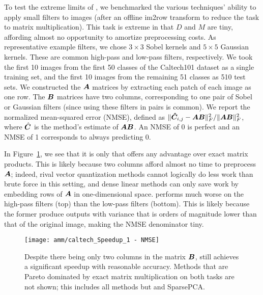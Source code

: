 To test the extreme limits of \ours, we benchmarked the various techniques' ability to apply small filters to images (after an offline im2row transform to reduce the task to matrix multiplication). This task is extreme in that $D$ and $M$ are tiny, affording almost no opportunity to amortize preprocessing costs. As representative example filters, we chose $3 \times 3$ Sobel kernels and $5 \times 5$ Gaussian kernels. These are common high-pass and low-pass filters, respectively. We took the first 10 images from the first 50 classes of the Caltech101 dataset \cite{caltech} as a single training set, and the first 10 images from the remaining 51 classes as 510 test sets. We constructed the $\bm{A}$ matrices by extracting each patch of each image as one row. The $\bm{B}$ matrices have two columns, corresponding to one pair of Sobel or Gaussian filters (since using these filters in pairs is common). %
We report the normalized mean-squared error (NMSE), defined as $\lVert\bm{\hat{C}}_{i,j} - \bm{A}\bm{B}\rVert^2_F / \lVert\bm{A}\bm{B}\rVert^2_F$, where $\hat{\bm{C}}$ is the method's estimate of $\bm{A}\bm{B}$. An NMSE of 0 is perfect and an NMSE of 1 corresponds to always predicting 0.

In Figure~\ref{fig:caltech}, we see that it is only \oursp that offers any advantage over exact matrix products. This is likely because two columns afford almost no time to preprocess $\bm{A}$; indeed, rival vector quantization methods cannot logically do less work than brute force in this setting, and dense linear methods can only save work by embedding rows of $\bm{A}$ in one-dimensional space.
\oursp performs much worse on the high-pass filters (top) than the low-pass filters (bottom). This is likely because the former produce outputs with variance that is orders of magnitude lower than that of the original image, making the NMSE denominator tiny.

\begin{figure}[h]
\begin{center}
\texttt{[image: amm/caltech\_Speedup\_1 - NMSE]}
\caption{Despite there being only two columns in the matrix $\bm{B}$, \oursp still achieves a significant speedup with reasonable accuracy. Methods that are Pareto dominated by exact matrix multiplication on both tasks are not shown; this includes all methods but \oursp and SparsePCA.} %
\label{fig:caltech}
\end{center}
\end{figure}



